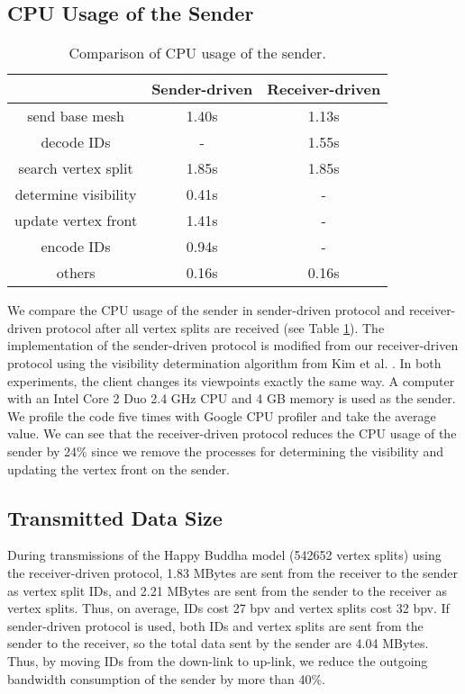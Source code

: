 \subsection{CPU Usage of the Sender}
\begin{table}[b]
\centering
\begin{tabular}{|c|c|c|}
\hline
&Sender-driven &Receiver-driven\\
\hline
send    base mesh           & 1.40s & 1.13s  \\
decode  IDs                 & -     & 1.55s  \\
search vertex split         & 1.85s  & 1.85s \\
determine visibility        & 0.41s & - \\
update vertex front         & 1.41s & - \\
encode IDs                  & 0.94s & - \\
others                      &0.16s  & 0.16s\\
\hline
\end{tabular}
\caption{Comparison of CPU usage of the sender.
\label{t:dstream:cpu}}
\end{table}
We compare the CPU usage of the sender in sender-driven
protocol and receiver-driven protocol after all vertex splits
are received (see Table \ref{t:dstream:cpu}). 
The implementation of the sender-driven protocol is modified from
our receiver-driven protocol using the visibility determination
algorithm from Kim et al. \cite{kim:view}. %
In both experiments, the client changes its viewpoints exactly the
same way.
A computer with an Intel Core 2 Duo 2.4 GHz CPU and 4 GB memory is
used as the sender.  We profile the code five times 
with Google CPU profiler and take the average value.
We can see that the receiver-driven protocol reduces the CPU usage
of the sender by 24\% since we remove the processes for determining the visibility and updating the vertex front on the sender. 
\subsection{Transmitted Data Size}
During transmissions of the Happy Buddha model (542652 vertex splits) using 
the receiver-driven protocol, 1.83 MBytes are sent from the receiver
to the sender as vertex split IDs, and 2.21 MBytes are sent from the sender 
to the receiver as vertex splits. 
Thus, on average, IDs cost 27 bpv and vertex splits cost 32 bpv.
If sender-driven protocol is used, both IDs and 
vertex splits are sent from the sender to the receiver, so the total data 
sent by the sender are 4.04 MBytes. Thus, by moving IDs from the down-link to up-link, we reduce the outgoing bandwidth consumption of the sender by more than 40\%.

